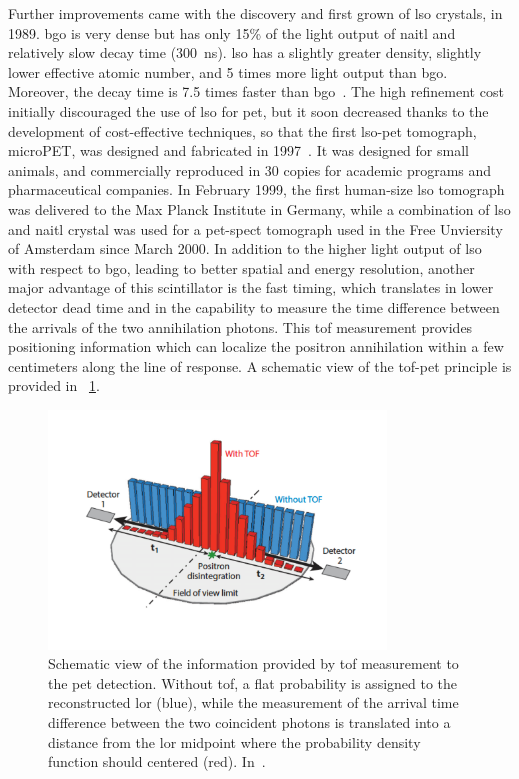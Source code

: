 Further improvements came with the discovery and first grown of \gls{lso} crystals, in 1989. \gls{bgo} is very dense but has only 15\% of the light output of \gls{naitl} and relatively slow decay time (300~ns). \gls{lso} has a slightly greater density, slightly lower effective atomic number, and 5 times more light output than \gls{bgo}. Moreover, the decay time is 7.5 times faster than \gls{bgo}~\parencite{Melcher1992}. The high refinement cost initially discouraged the use of \gls{lso} for \gls{pet}, but it soon decreased thanks to the development of cost-effective techniques, so that the first \gls{lso}-\gls{pet} tomograph, microPET, was designed and fabricated in 1997~\parencite{Cherry1997}. It was designed for small animals, and commercially reproduced in 30 copies for academic programs and pharmaceutical companies. In February 1999, the first human-size \gls{lso} tomograph was delivered to the Max Planck Institute in Germany, while a combination of \gls{lso} and \gls{naitl} crystal was used for a \gls{pet}-\gls{spect} tomograph used in the Free Unviersity of Amsterdam since March 2000. 
In addition to the higher light output of \gls{lso} with respect to \gls{bgo}, leading to better spatial and energy resolution, another major advantage of this scintillator is the fast timing, which translates in lower detector dead time and in the capability to measure the time difference between the arrivals of the two annihilation photons. This \gls{tof} measurement provides positioning information which can localize the positron annihilation within a few centimeters along the line of response. A schematic view of the \gls{tof}-\gls{pet} principle is provided in \figurename~\ref{chap2::fig::NM_PET_TOF}. 

\begin{figure}[!htbp]
\centering
\includegraphics[width=0.8\textwidth]{03_GraphicFiles/chapter1_Introduction/PET_TOF.pdf}
\caption{Schematic view of the information provided by \gls{tof} measurement to the \gls{pet} detection. Without \gls{tof}, a flat probability is assigned to the reconstructed \gls{lor} (blue), while the measurement of the arrival time difference between the two coincident photons is translated into a distance from the \gls{lor} midpoint where the probability density function should centered (red). In~\cite{Vaquero2015}.}
\label{chap2::fig::NM_PET_TOF}
\end{figure}   

